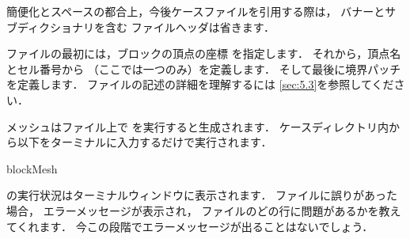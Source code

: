 簡便化とスペースの都合上，今後ケースファイルを引用する際は，
バナーとサブディクショナリを含む
ファイルヘッダは省きます．

ファイルの最初には，ブロックの頂点の座標
%
%
を指定します．
それから，頂点名とセル番号から
%
%
（ここでは一つのみ）を定義します．
そして最後に境界パッチを定義します．
ファイルの記述の詳細を理解するには
\autoref{sec:5.3}を参照してください．

メッシュはファイル上で
を実行すると生成されます．
ケースディレクトリ内から以下をターミナルに入力するだけで実行されます．
\begin{OFverbatim}[terminal]
blockMesh
\end{OFverbatim}
の実行状況はターミナルウィンドウに表示されます．
%
%
ファイルに誤りがあった場合，
エラーメッセージが表示され，
ファイルのどの行に問題があるかを教えてくれます．
今この段階でエラーメッセージが出ることはないでしょう．

